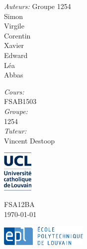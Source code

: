 \documentclass[a4paper]{report}
\begin{document}
\begin{titlepage}
\begin{center}
\begin{minipage}{0.4\textwidth}
\begin{flushleft} \large
\emph{Auteurs:}
Groupe 1254\\ Simon  \\ Virgile  \\ Corentin  \\ Xavier  \\Edward {}\\ Léa \\ Abbas 
\end{flushleft}
\end{minipage}
\begin{minipage}{0.4\textwidth}
\begin{flushright} \large
\emph{Cours:} \\
FSAB1503\\
\emph{Groupe:} \\
1254\\
\emph{Tuteur:} \\
Vincent Destoop \textsc{}
\end{flushright}
\end{minipage}
\vspace{0.4cm}

\begin{minipage}{0.3\textwidth}
\begin{flushleft}
\includegraphics[height=2cm]{Shema/logo_UCL_NEW_janv2013.JPG}
\end{flushleft}
\end{minipage}
\begin{minipage}{0.3\textwidth}
\begin{center}
{\large FSA12BA}\\
{\large \today}
\end{center}
\end{minipage}
\begin{minipage}{0.3\textwidth}
\begin{flushright}
\includegraphics[height=1cm]{Shema/epl-logo.jpg}
\end{flushright}
\end{minipage}
\end{center}
\end{titlepage}
\tableofcontents






\appendix

\end{document}
